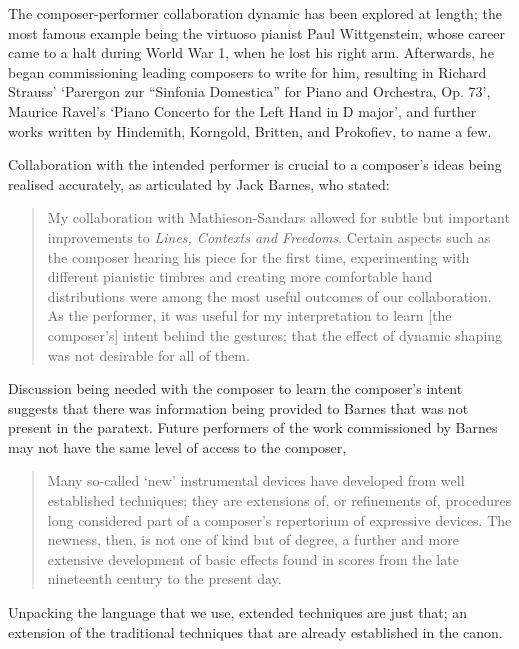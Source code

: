 The composer-performer collaboration dynamic has been explored at length; the most famous example being the virtuoso pianist Paul Wittgenstein, whose career came to a halt during World War 1, when he lost his right arm.
Afterwards, he began commissioning leading composers to write for him, resulting in Richard Strauss' `Parergon zur ``Sinfonia Domestica'' for Piano and Orchestra, Op. 73', Maurice Ravel's `Piano Concerto for the Left Hand in D major', and further works written by Hindemith, Korngold, Britten, and Prokofiev, to name a few.\autocite[107]{predotaPaulWittgensteinVoice2014}

Collaboration with the intended performer is crucial to a composer's ideas being realised accurately, as articulated by Jack Barnes, who stated:
\begin{quotation}
    My collaboration with Mathieson-Sandars allowed for subtle but important improvements to \emph{Lines, Contexts and Freedoms}. 
    Certain aspects such as the composer hearing his piece for the first time, experimenting with different pianistic timbres and creating more comfortable hand distributions were among the most useful outcomes of our collaboration. 
    As the performer, it was useful for my interpretation to learn [the composer's] intent behind the gestures; that the effect of dynamic shaping was not desirable for all of them.\autocite[20]{jackbarnesExaminationComposerPerformerCollaborations2017}
\end{quotation}
Discussion being needed with the composer to learn the composer's intent suggests that there was information being provided to Barnes that was not present in the paratext.
Future performers of the work commissioned by Barnes may not have the same level of access to the composer,

\begin{quotation}
    Many so-called ‘new’ instrumental devices have developed from well established techniques; they are extensions of, or refinements of, procedures long considered part of a composer’s repertorium of expressive devices. The newness, then, is not one of kind but of degree, a further and more extensive development of basic effects found in scores from the late nineteenth century to the present day.\autocite[3]{readContemporaryInstrumentalTechniques1976}
\end{quotation}

Unpacking the language that we use, extended techniques are just that; an extension of the traditional techniques that are already established in the canon. 

